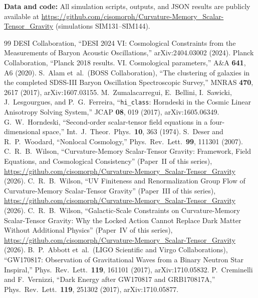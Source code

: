 \documentclass[12pt,a4paper]{article}
\theoremstyle{plain}
\begin{document}
\bigskip
\noindent\textbf{Data and code:}
All simulation scripts, outputs, and JSON results are publicly available at
\url{https://github.com/cisomorph/Curvature-Memory_Scalar-Tensor_Gravity}
(simulations SIM131--SIM144).

\begin{thebibliography}{99}
  DESI Collaboration,
  ``DESI 2024 VI: Cosmological Constraints from the Measurements of
    Baryon Acoustic Oscillations,''
  arXiv:2404.03002 (2024).
  Planck Collaboration,
  ``Planck 2018 results. VI. Cosmological parameters,''
  A\&A \textbf{641}, A6 (2020).
  S.~Alam et~al.\ (BOSS Collaboration),
  ``The clustering of galaxies in the completed SDSS-III Baryon Oscillation
    Spectroscopic Survey,''
  MNRAS \textbf{470}, 2617 (2017), arXiv:1607.03155.
  M.~Zumalacarregui, E.~Bellini, I.~Sawicki, J.~Lesgourgues, and
  P.~G.~Ferreira,
  ``\texttt{hi\_class}: Horndeski in the Cosmic Linear Anisotropy Solving
    System,''
  JCAP \textbf{08}, 019 (2017), arXiv:1605.06349.
  G.~W.~Horndeski,
  ``Second-order scalar-tensor field equations in a four-dimensional space,''
  Int.\ J.\ Theor.\ Phys.\ \textbf{10}, 363 (1974).
  S.~Deser and R.~P.~Woodard,
  ``Nonlocal Cosmology,''
  Phys.\ Rev.\ Lett.\ \textbf{99}, 111301 (2007).
  C.~R.~B.~Wilson,
  ``Curvature-Memory Scalar-Tensor Gravity: Framework, Field Equations, and Cosmological Consistency''
  (Paper~II of this series), \url{https://github.com/cisomorph/Curvature-Memory_Scalar-Tensor_Gravity} (2026).
  C.~R.~B.~Wilson,
  ``UV Finiteness and Renormalization Group Flow of Curvature-Memory Scalar-Tensor Gravity''
  (Paper~III of this series), \url{https://github.com/cisomorph/Curvature-Memory_Scalar-Tensor_Gravity} (2026).
  C.~R.~B.~Wilson,
  ``Galactic-Scale Constraints on Curvature-Memory Scalar-Tensor Gravity: Why the Locked Action Cannot Replace Dark Matter Without Additional Physics''
  (Paper~IV of this series), \url{https://github.com/cisomorph/Curvature-Memory_Scalar-Tensor_Gravity} (2026).
  B.~P.~Abbott et~al.\ (LIGO Scientific and Virgo Collaborations),
  ``GW170817: Observation of Gravitational Waves from a Binary Neutron Star
    Inspiral,''
  Phys.\ Rev.\ Lett.\ \textbf{119}, 161101 (2017), arXiv:1710.05832.
  P.~Creminelli and F.~Vernizzi,
  ``Dark Energy after GW170817 and GRB170817A,''
  Phys.\ Rev.\ Lett.\ \textbf{119}, 251302 (2017), arXiv:1710.05877.

\end{thebibliography}
\end{document}
